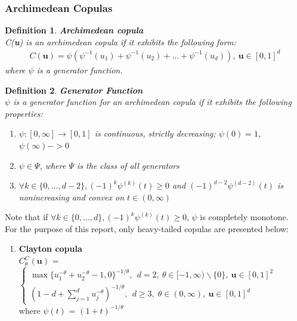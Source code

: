 \documentclass[12pt]{report}
\newtheorem{definition}{Definition}[subsection]
\newcommand{\1}{\mathbf{1}}
\begin{document}
\begin{flushleft}
\subsubsection{Archimedean Copulas}
\vspace{0.5cm}

\begin{definition}\label{ArchimedeanDefinition}
\textit{\normalfont\parencite{HofertBook}} \:\textbf{Archimedean copula} \\

C(\textbf{u}) is an archimedean copula if it exhibits the following form: \\
\vspace{-0.8cm}
\begin{align*}
C(\textbf{u}) = \psi(\psi^{-1}(u_{1}) + \psi^{-1}(u_{2}) + \dots + \psi^{-1}(u_{d})), \: \textbf{u} \in [0, 1]^d
\end{align*}
where $\psi$ is a generator function.
\end{definition}

\begin{definition}\label{GeneratorDefinition}
\textit{\normalfont\parencite{HofertBook}} \:\textbf{Generator Function} \\

$\psi$ is a generator function for an archimedean copula if it exhibits the following properties: \\
\begin{enumerate}
\item $\psi : [0,\infty] \rightarrow [0,1]$ is continuous, strictly decreasing; $\psi(0) = 1$, $\psi(\infty) -> 0$
\item $\psi \in \Psi$, where $\Psi$ is the class of all generators
\item $ \forall k \in \{0, \dots, d - 2 \}, (-1)^{k} \psi^{(k)}(t) \ge 0$ and $(-1)^{d-2}\psi^{(d-2)}(t)$ is nonincreasing and convex on $t \in (0,\infty)$ 
\end{enumerate}
\end{definition}
Note that if $\forall k \in \{0, \dots, d \}, (-1)^{k} \psi^{(k)}(t) \ge 0$, $\psi$ is completely monotone. \\

For the purpose of this report, only heavy-tailed copulas are presented below:\\
\begin{enumerate}
\item \textbf{Clayton copula} \parencite{ClaytonCopula} \\
\vspace{0.5cm}
$C^{C}_{\theta}(\textbf{u})$ = $\left\{
\begin{array}{ll} 
\max \{ u_{1}^{-\theta} + u_{2}^{-\theta} - 1, 0 \}^{-1/\theta}, \: \: d = 2, \: \theta \in [-1,\infty) \backslash \{ 0 \}, \: \textbf{u} \in [0,1]^{2} \\
(1 - d + \sum_{j = 1}^{d} u^{- \theta}_{j} )^{-1/\theta}, \: \: d \ge 3, \; \theta \in (0,\infty), \: \textbf{u} \in [0,1]^{d}
\end{array} 
\right.$ 
\\
\vspace{0.5cm}
where $\psi(t)$ = $(1 + t)^{-1/\theta}$ 


\end{enumerate}
\end{flushleft}
\end{document}
